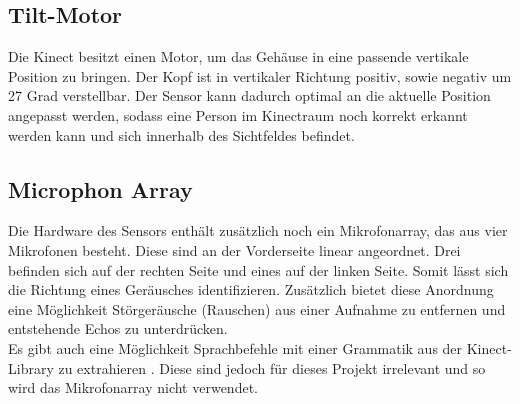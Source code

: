 	
\subsection{Tilt-Motor}
	Die Kinect besitzt einen Motor, um das Gehäuse in eine passende vertikale Position zu bringen.
	Der Kopf ist in vertikaler Richtung positiv, sowie negativ um 27 Grad verstellbar. Der Sensor kann
	dadurch optimal an die aktuelle Position angepasst werden, sodass eine Person im
	Kinectraum noch korrekt erkannt werden kann und sich innerhalb des Sichtfeldes befindet.
	\cite{jana2012kinect}
	
	
\subsection{Microphon Array}
	Die Hardware des Sensors enthält zusätzlich noch ein Mikrofonarray, das aus vier Mikrofonen besteht.
	Diese sind an der Vorderseite linear angeordnet. Drei befinden sich auf der rechten Seite und eines
	auf der linken Seite. Somit lässt sich die Richtung eines Geräusches identifizieren. Zusätzlich bietet
	diese Anordnung eine Möglichkeit Störgeräusche (Rauschen) aus einer Aufnahme zu entfernen und entstehende
	Echos zu unterdrücken. \\
	Es gibt auch eine Möglichkeit Sprachbefehle mit einer Grammatik aus der Kinect-Library zu extrahieren \cite{jana2012kinect}. Diese sind jedoch für 
	dieses Projekt irrelevant und so wird das Mikrofonarray nicht verwendet.
	
